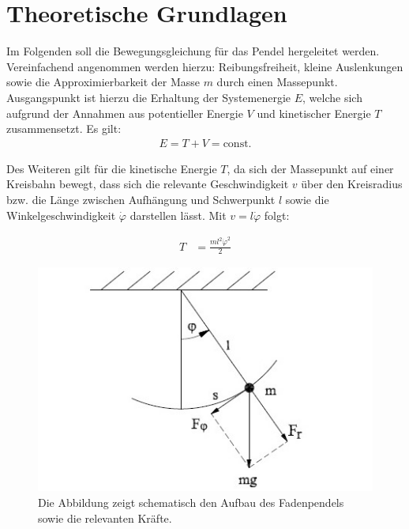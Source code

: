 \section{Theoretische Grundlagen}
\label{theorie}



Im Folgenden soll die Bewegungsgleichung für das Pendel hergeleitet werden. Vereinfachend angenommen werden hierzu: Reibungsfreiheit, kleine Auslenkungen sowie die Approximierbarkeit der Masse $m$ durch einen Massepunkt. 
Ausgangspunkt ist hierzu die Erhaltung der Systemenergie $E$, welche sich aufgrund der Annahmen aus potentieller Energie $V$ und kinetischer Energie $T$ zusammensetzt. Es gilt:
\begin{align}
E=T+V=\textrm{const.}
\label{energie}
\end{align}

Des Weiteren gilt für die kinetische Energie $T$, da sich der Massepunkt auf einer Kreisbahn bewegt, dass sich  die relevante Geschwindigkeit $v$ über den Kreisradius bzw. die Länge zwischen Aufhängung und Schwerpunkt $l$ sowie die Winkelgeschwindigkeit $\dot{\varphi}$ darstellen lässt. Mit $v=l\dot{\varphi}$ folgt:
 
\begin{align}
T&=\frac{ml^2\dot{\varphi}^2}{2}
\label{kin}
\end{align}


\begin{figure}
	\centering
	\includegraphics{faden}
	\caption{Die Abbildung zeigt schematisch den Aufbau des Fadenpendels sowie die relevanten Kräfte.}
	\label{faden}
\end{figure}

